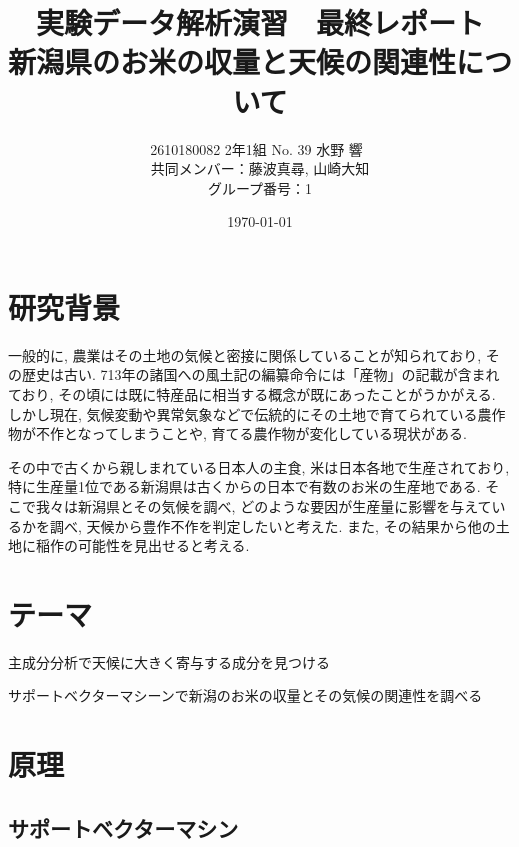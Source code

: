 \documentclass{jarticle}
\title{実験データ解析演習　最終レポート\\ 新潟県のお米の収量と天候の関連性について}
\author{2610180082 2年1組 No. 39  水野 響\ \\ 共同メンバー：藤波真尋, 山崎大知\\グループ番号：1}
\date{\today}
\begin{document}
\maketitle
\tableofcontents%
\newpage


\section{研究背景}
一般的に, 農業はその土地の気候と密接に関係していることが知られており, その歴史は古い. 713年の諸国への風土記の編纂命令には「産物」の記載が含まれており, その頃には既に特産品に相当する概念が既にあったことがうかがえる. しかし現在, 気候変動や異常気象などで伝統的にその土地で育てられている農作物が不作となってしまうことや, 育てる農作物が変化している現状がある.

その中で古くから親しまれている日本人の主食, 米は日本各地で生産されており, 特に生産量1位である新潟県は古くからの日本で有数のお米の生産地である. そこで我々は新潟県とその気候を調べ, どのような要因が生産量に影響を与えているかを調べ, 天候から豊作不作を判定したいと考えた. また, その結果から他の土地に稲作の可能性を見出せると考える.

\hypertarget{header-n2003}{%
\section{テーマ}\label{header-n2003}}

主成分分析で天候に大きく寄与する成分を見つける

サポートベクターマシーンで新潟のお米の収量とその気候の関連性を調べる

\hypertarget{header-n2005}{%
\section{原理}\label{header-n2005}}



\hypertarget{header-n2009}{%
\subsection{サポートベクターマシン}\label{header-n2009}}
\end{document}
